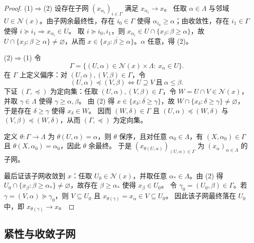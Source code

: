 \documentclass[lang=cn,a4paper,newtx,figureplace=section,tableplace=section]{elegantbook}
\begin{document}
 \begin{proof}
 (1)$\Rightarrow$(2) 设存在子网 $(x_{\alpha_i})_{i\in\Gamma}$ 满足 $x_{\alpha_i}\to x$。
 任取 $\alpha\in\Lambda$ 与邻域 $U\in\mathcal{N}(x)$。由子网余最终性，存在 $i_0\in\Gamma$ 使得 $\alpha_{i_0}\ge\alpha$；由收敛性，存在 $i_1\in\Gamma$ 使得 $i\succeq i_1\Rightarrow x_{\alpha_i}\in U$。
 取 $i\succeq i_0,i_1$，则 $x_{\alpha_i}\in U\cap\{x_{\beta}:\beta\ge\alpha\}$，故 $U\cap\{x_{\beta}:\beta\ge\alpha\}\neq\varnothing$，从而 $x\in\overline{\{x_{\beta}:\beta\ge\alpha\}}$。$\alpha$ 任意，得 (2)。
 
 (2)$\Rightarrow$(1) 令
 \[
 \Gamma=\{(U,\alpha)\in\mathcal{N}(x)\times\Lambda:\ x_{\alpha}\in U\}.
 \]
 在 $\Gamma$ 上定义偏序：对 $(U,\alpha),(V,\beta)\in\Gamma$，令
 \[
 (U,\alpha)\preceq (V,\beta)\iff U\supseteq V\ \text{且}\ \alpha\le\beta.
 \]
 下证 $(\Gamma,\preceq)$ 为定向集：任取 $(U,\alpha),(V,\beta)\in\Gamma$，令 $W=U\cap V\in\mathcal{N}(x)$，并取 $\gamma\in\Lambda$ 使得 $\gamma\ge\alpha,\beta$。
 由 (2) 得 $x\in\overline{\{x_{\delta}:\delta\ge\gamma\}}$，故 $W\cap\{x_{\delta}:\delta\ge\gamma\}\neq\varnothing$，于是存在 $\delta\ge\gamma$ 使得 $x_{\delta}\in W$。
 因而 $(W,\delta)\in\Gamma$ 且 $(U,\alpha)\preceq (W,\delta)$ 与 $(V,\beta)\preceq (W,\delta)$，从而 $(\Gamma,\preceq)$ 为定向集。
 
 定义 $\theta:\Gamma\to\Lambda$ 为 $\theta(U,\alpha)=\alpha$，则 $\theta$ 保序，且对任意 $\alpha_0\in\Lambda$，有 $(X,\alpha_0)\in\Gamma$ 且 $\theta(X,\alpha_0)=\alpha_0$，因此 $\theta$ 余最终。
 于是 $(x_{\theta(U,\alpha)})_{(U,\alpha)\in\Gamma}$ 为 $(x_{\alpha})_{\alpha\in\Lambda}$ 的子网。
 
 最后证该子网收敛到 $x$：任取 $U_0\in\mathcal{N}(x)$，并取任意 $\alpha_*\in\Lambda$。由 (2) 得 $U_0\cap\{x_{\beta}:\beta\ge\alpha_*\}\neq\varnothing$，故存在 $\beta\ge\alpha_*$ 使得 $x_{\beta}\in U_0$。
 令 $\gamma_0=(U_0,\beta)\in\Gamma$。若 $\gamma=(V,\alpha)\succeq\gamma_0$，则 $V\subseteq U_0$ 且 $x_{\theta(\gamma)}=x_{\alpha}\in V\subseteq U_0$。
 因此该子网最终落在 $U_0$ 中，即 $x_{\theta(\gamma)}\to x$。
 \end{proof}

\subsection{紧性与收敛子网}
\end{document}
